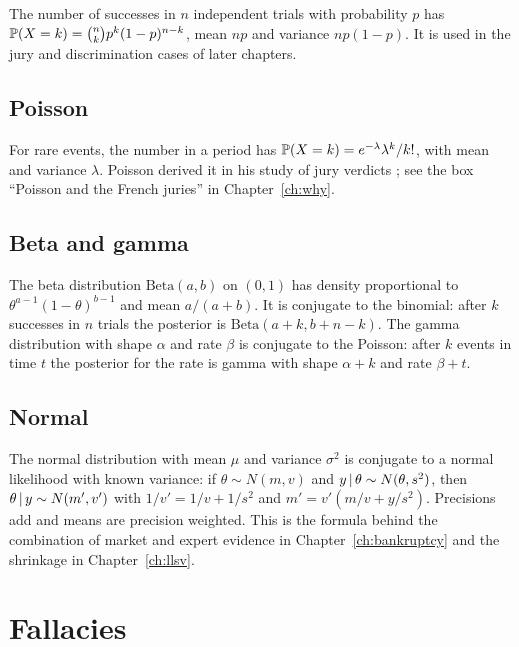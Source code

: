 The number of successes in $n$ independent trials with probability $p$ has $\mathbb{P}(X = k) = \binom{n}{k}p^k(1-p)^{n-k}$, mean $np$ and variance $np(1-p)$. It is used in the jury and discrimination cases of later chapters.

\subsection{Poisson}

For rare events, the number in a period has $\mathbb{P}(X = k) = e^{-\lambda}\lambda^k/k!$, with mean and variance $\lambda$. Poisson derived it in his study of jury verdicts \citep{poisson1837}; see the box ``Poisson and the French juries'' in Chapter~\ref{ch:why}.

\subsection{Beta and gamma}

The beta distribution $\text{Beta}(a,b)$ on $(0,1)$ has density proportional to $\theta^{a-1}(1-\theta)^{b-1}$ and mean $a/(a+b)$. It is conjugate to the binomial: after $k$ successes in $n$ trials the posterior is $\text{Beta}(a+k, b+n-k)$. The gamma distribution with shape $\alpha$ and rate $\beta$ is conjugate to the Poisson: after $k$ events in time $t$ the posterior for the rate is gamma with shape $\alpha + k$ and rate $\beta + t$.

\subsection{Normal}

The normal distribution with mean $\mu$ and variance $\sigma^2$ is conjugate to a normal likelihood with known variance: if $\theta \sim N(m, v)$ and $y\,\vert\,\theta \sim N(\theta, s^2)$, then $\theta\,\vert\, y \sim N(m', v')$ with $1/v' = 1/v + 1/s^2$ and $m' = v'(m/v + y/s^2)$. Precisions add and means are precision weighted. This is the formula behind the combination of market and expert evidence in Chapter~\ref{ch:bankruptcy} and the shrinkage in Chapter~\ref{ch:llsv}.

\section{Fallacies}

